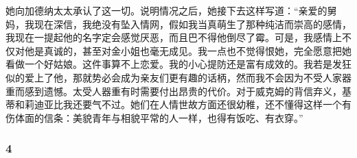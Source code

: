 \par 她向加德纳太太承认了这一切。说明情况之后，她接下去这样写道：“亲爱的舅妈，我现在深信，我绝没有坠入情网，假如我当真萌生了那种纯洁而崇高的感情，我现在一提起他的名字定会感觉厌恶，而且巴不得他倒尽了霉。可是，我感情上不仅对他是真诚的，甚至对金小姐也毫无成见。我一点也不觉得恨她，完全愿意把她看做一个好姑娘。这件事算不上恋爱。我的小心提防还是富有成效的。我若是发狂似的爱上了他，那就势必会成为亲友们更有趣的话柄，然而我不会因为不受人家器重而感到遗憾。太受人器重有时需要付出昂贵的代价。对于威克姆的背信弃义，基蒂和莉迪亚比我还要气不过。她们在人情世故方面还很幼稚，还不懂得这样一个有伤体面的信条：美貌青年与相貌平常的人一样，也得有饭吃、有衣穿。”


\subsubsection*{4}

